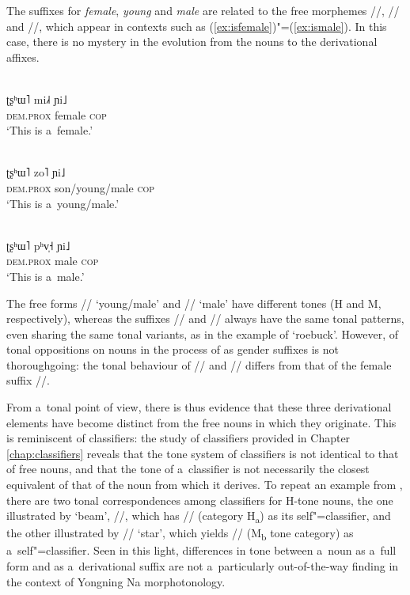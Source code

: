 The suffixes for \textit{female}, \textit{young} and \textit{male} are related to the free morphemes //, // and //, which
appear in contexts such as (\ref{ex:isfemale})"=(\ref{ex:ismale}). In this case, there is no mystery in the evolution from the nouns to the derivational affixes. 

\begin{exe}
	\ex
	\label{ex:isfemale}
	\\
	\gll ʈʂʰɯ˥	mi˩˧	ɲi˩\\
	\textsc{dem.prox}		female	\textsc{cop}\\
	\glt ‘This is a~female.’
\end{exe}

\begin{exe}
	\ex
	\label{ex:isyoung}
	\\
	\gll ʈʂʰɯ˥	zo˥	ɲi˩\\
	\textsc{dem.prox}		son/young/male	\textsc{cop}\\
	\glt ‘This is a~young/male.’
\end{exe}

\begin{exe}
	\ex
	\label{ex:ismale}
	\\
	\gll ʈʂʰɯ˥	pʰv̩˧	ɲi˩\\
	\textsc{dem.prox}		male	\textsc{cop}\\
	\glt ‘This is a~male.’
\end{exe}

The free forms // ‘young/male’ and // ‘male’ have different tones (H and M, respectively), whereas the suffixes // and // always have the same tonal patterns, even sharing the same tonal variants, as in the example of ‘roebuck’. However,  of tonal oppositions on nouns in the process of  as gender suffixes is not thoroughgoing: the tonal behaviour of // and // differs from that of the female suffix //. 

From a~tonal point of view, there is thus evidence that these three derivational elements have become distinct from the free nouns in which they originate. This is reminiscent of classifiers: the study of classifiers provided in Chapter \ref{chap:classifiers} reveals that the tone system of classifiers is not identical to that of free nouns, and that the tone of a~classifier is not necessarily the closest equivalent of that of the noun from which it derives. To repeat an example from , there are two tonal correspondences among classifiers for H-tone nouns, the one illustrated by ‘beam’, //, which has // (category H\textsubscript{a}) as its self"=classifier, and the other illustrated by // ‘star’, which yields // (M\textsubscript{b} tone category) as a~self"=classifier. Seen in this light, differences in tone between a~noun as a~full form and as a~derivational suffix are not a~particularly out-of-the-way finding in the context of Yongning Na morphotonology.
 
